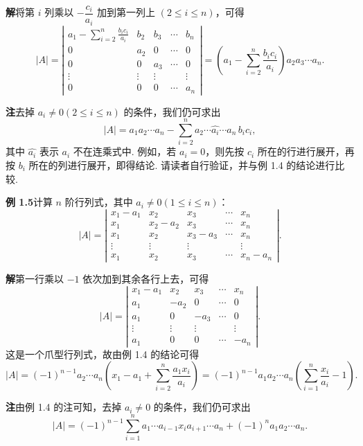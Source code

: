 \documentclass[UTF8,12pt,a4paper,fontset=fandol]{ctexart}
\begin{document}
\noindent\textbf{解}\quad 将第 $i$ 列乘以 $-\dfrac{c_i}{a_i}$ 加到第一列上 $(2\le i\le n)$，可得
\[
|A|=
\left|\begin{array}{ccccc}
a_1-\displaystyle\sum_{i=2}^n\frac{b_ic_i}{a_i} & b_2 & b_3 & \cdots & b_n\\
0 & a_2 & 0 & \cdots & 0\\
0 & 0 & a_3 & \cdots & 0\\
\vdots & \vdots & \vdots &        & \vdots\\
0 & 0 & 0 & \cdots & a_n
\end{array}\right|
=\left(a_1-\sum_{i=2}^n\frac{b_ic_i}{a_i}\right)a_2a_3\cdots a_n.
\]

\noindent\textbf{注}\quad 去掉 $a_i\ne0(2\le i\le n)$ 的条件，我们仍可求出
\[
|A|=a_1a_2\cdots a_n-\sum_{i=2}^n a_2\cdots\widehat{a_i}\cdots a_n\,b_ic_i,
\]
其中 $\widehat{a_i}$ 表示 $a_i$ 不在连乘式中. 例如，若 $a_i=0$，则先按 $c_i$ 所在的行进行展开，再按 $b_i$ 所在的列进行展开，即得结论. 请读者自行验证，并与例 1.4 的结论进行比较.

\noindent\textbf{例 1.5}\quad 计算 $n$ 阶行列式，其中 $a_i\ne0(1\le i\le n)$：
\[
|A|=\left|\begin{array}{ccccc}
x_1-a_1 & x_2 & x_3 & \cdots & x_n\\
x_1 & x_2-a_2 & x_3 & \cdots & x_n\\
x_1 & x_2 & x_3-a_3 & \cdots & x_n\\
\vdots & \vdots & \vdots &        & \vdots\\
x_1 & x_2 & x_3 & \cdots & x_n-a_n
\end{array}\right|.
\]

\noindent\textbf{解}\quad 第一行乘以 $-1$ 依次加到其余各行上去，可得
\[
|A|=\left|\begin{array}{ccccc}
x_1-a_1 & x_2 & x_3 & \cdots & x_n\\
a_1 & -a_2 & 0 & \cdots & 0\\
a_1 & 0 & -a_3 & \cdots & 0\\
\vdots & \vdots & \vdots &        & \vdots\\
a_1 & 0 & 0 & \cdots & -a_n
\end{array}\right|.
\]
这是一个爪型行列式，故由例 1.4 的结论可得
\[
|A|=(-1)^{n-1}a_2\cdots a_n\left(x_1-a_1+\sum_{i=2}^n\frac{a_1x_i}{a_i}\right)
=(-1)^{n-1}a_1a_2\cdots a_n\left(\sum_{i=1}^n\frac{x_i}{a_i}-1\right).
\]

\noindent\textbf{注}\quad 由例 1.4 的注可知，去掉 $a_i\ne0$ 的条件，我们仍可求出
\[
|A|=(-1)^{n-1}\sum_{i=1}^n a_1\cdots a_{i-1}x_ia_{i+1}\cdots a_n
+(-1)^n a_1a_2\cdots a_n.
\]
\end{document}
